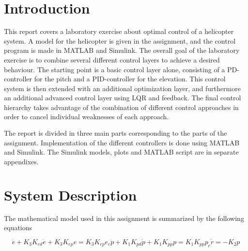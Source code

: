 \documentclass[a4paper, 12pt]{article}\usepackage[utf8]{inputenc}
\begin{document}
\section{Introduction}


This report covers a laboratory exercise about optimal control of a helicopter system. A model for the helicopter is given in the assignment, and the control program is made in MATLAB and Simulink. The overall goal of the laboratory exercise is to combine several different control layers to achieve a desired behaviour. The starting point is a basic control layer alone, consisting of a PD-controller for the pitch and a PID-controller for the elevation. This control system is then extended with an additional optimization layer, and furthermore an additional advanced control layer using LQR and feedback. The final control hierarchy takes advantage of the combination of different control approaches in order to cancel individual weaknesses of each approach.


The report is divided in three main parts corresponding to the parts of the assignment. Implementation of the different controllers is done using MATLAB and Simulink. The Simulink models, plots and MATLAB script are in separate appendixes.



\section{System Description}

The mathematical model used in this assignment is summarized by the following equations

\begin{subequations}\label{model_eq}
    \begin{equation}
        \ddot{e}+K_3K_{ed}\dot{e}+K_3K_{ep}e=K_3K_{ep}e_c
    \end{equation}
    \begin{equation}
        \ddot{p} +K_1K_{pd}\dot{p}+K_1K_{pp}p=K_1K_{pp}p_c
    \end{equation}
    \begin{equation}
        \dot{r}=-K_2p
    \end{equation}
\end{subequations}
\end{document}
